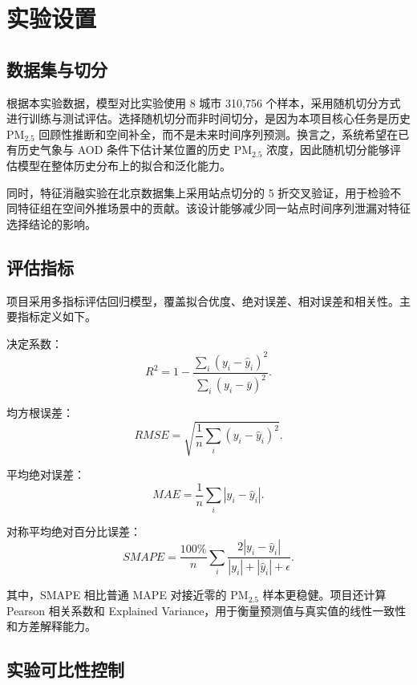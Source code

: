 \documentclass[UTF8,zihao=-4,a4paper]{ctexart}
\newcommand{\pmfine}{PM$_{2.5}$}
\newcommand{\aod}{AOD}
\begin{document}
\section{实验设置}

\subsection{数据集与切分}

根据本实验数据，模型对比实验使用 8 城市 310,756 个样本，采用随机切分方式进行训练与测试评估。选择随机切分而非时间切分，是因为本项目核心任务是历史 \pmfine{} 回顾性推断和空间补全，而不是未来时间序列预测。换言之，系统希望在已有历史气象与 \aod{} 条件下估计某位置的历史 \pmfine{} 浓度，因此随机切分能够评估模型在整体历史分布上的拟合和泛化能力。

同时，特征消融实验在北京数据集上采用站点切分的 5 折交叉验证，用于检验不同特征组在空间外推场景中的贡献。该设计能够减少同一站点时间序列泄漏对特征选择结论的影响。

\subsection{评估指标}

项目采用多指标评估回归模型，覆盖拟合优度、绝对误差、相对误差和相关性。主要指标定义如下。

决定系数：
\begin{equation}
  R^2 = 1 - \frac{\sum_i (y_i-\hat{y}_i)^2}{\sum_i (y_i-\bar{y})^2}.
  \label{eq:r2}
\end{equation}

均方根误差：
\begin{equation}
  RMSE = \sqrt{\frac{1}{n}\sum_i (y_i-\hat{y}_i)^2}.
  \label{eq:rmse}
\end{equation}

平均绝对误差：
\begin{equation}
  MAE = \frac{1}{n}\sum_i |y_i-\hat{y}_i|.
  \label{eq:mae}
\end{equation}

对称平均绝对百分比误差：
\begin{equation}
  SMAPE = \frac{100\%}{n}\sum_i \frac{2|y_i-\hat{y}_i|}{|y_i|+|\hat{y}_i|+\epsilon}.
  \label{eq:smape}
\end{equation}

其中，SMAPE 相比普通 MAPE 对接近零的 \pmfine{} 样本更稳健。项目还计算 Pearson 相关系数和 Explained Variance，用于衡量预测值与真实值的线性一致性和方差解释能力。

\subsection{实验可比性控制}
\end{document}

